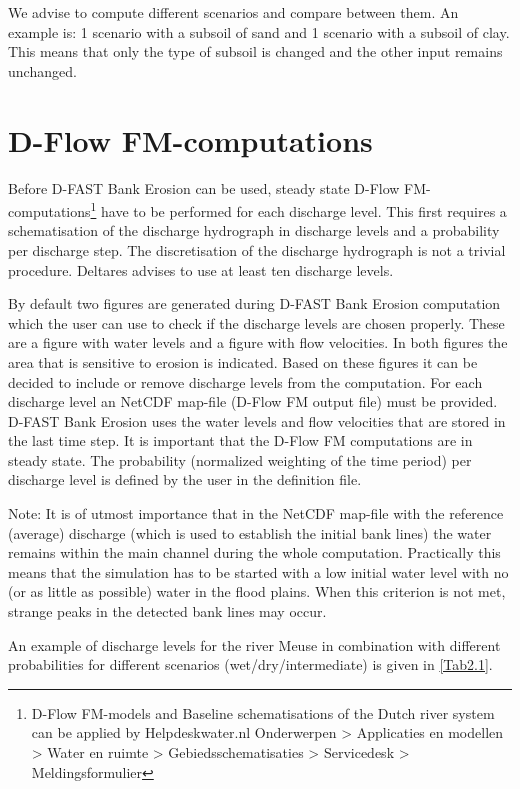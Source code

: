 We advise to compute different scenarios and compare between them.
An example is: 1 scenario with a subsoil of sand and 1 scenario with a subsoil of clay.
This means that only the type of subsoil is changed and the other input remains unchanged.

\section{D-Flow FM-computations}

Before D-FAST Bank Erosion can be used, steady state D-Flow FM-computations\footnote{D-Flow FM-models and Baseline schematisations of the Dutch river system can be applied by Helpdeskwater.nl Onderwerpen > Applicaties en modellen > Water en ruimte > Gebiedsschematisaties > Servicedesk > Meldingsformulier} have to be performed for each discharge level.
This first requires a schematisation of the discharge hydrograph in discharge levels and a probability per discharge step.
The discretisation of the discharge hydrograph is not a trivial procedure.
Deltares advises to use at least ten discharge levels.

By default two figures are generated during D-FAST Bank Erosion computation which the user can use to check if the discharge levels are chosen properly.
These are a figure with water levels and a figure with flow velocities.
In both figures the area that is sensitive to erosion is indicated.
Based on these figures it can be decided to include or remove discharge levels from the computation.
For each discharge level an NetCDF map-file (D-Flow FM output file) must be provided.
D-FAST Bank Erosion uses the water levels and flow velocities that are stored in the last time step.
It is important that the D-Flow FM computations are in steady state.
The probability (normalized weighting of the time period) per discharge level is defined by the user in the definition file.

Note: It is of utmost importance that in the NetCDF map-file with the reference (average) discharge (which is used to establish the initial bank lines) the water remains within the main channel during the whole computation.
Practically this means that the simulation has to be started with a low initial water level with no (or as little as possible) water in the flood plains.
When this criterion is not met, strange peaks in the detected bank lines may occur.



An example of discharge levels for the river Meuse in combination with different probabilities for different scenarios (wet/dry/intermediate) is given in \autoref{Tab2.1}.

